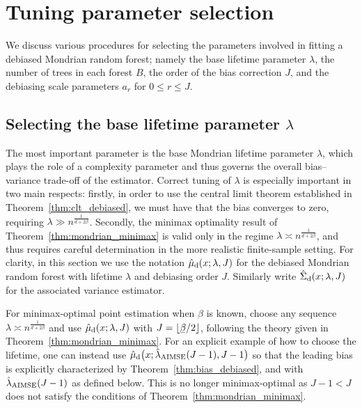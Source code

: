 \section{Tuning parameter selection}%
\label{sec:parameter_selection}

We discuss various procedures for selecting the parameters
involved in fitting a debiased Mondrian random forest;
namely the base lifetime parameter $\lambda$,
the number of trees in each forest $B$,
the order of the bias correction $J$,
and the debiasing scale parameters $a_r$ for $0 \leq r \leq J$.

\subsection{Selecting the base lifetime parameter
\texorpdfstring{$\lambda$}{lambda}}%

The most important parameter is the base Mondrian lifetime parameter $\lambda$,
which plays the role of a complexity parameter and thus governs the overall
bias--variance trade-off of the estimator.
Correct tuning of $\lambda$ is especially important in two main respects:
%
firstly, in order to use the central limit theorem established in
Theorem~\ref{thm:clt_debiased}, we must have that the bias converges to zero,
requiring $\lambda \gg n^{\frac{1}{d + 2\beta}}$.
%
Secondly, the minimax optimality result of Theorem~\ref{thm:mondrian_minimax}
is valid
only in the regime $\lambda \asymp n^{\frac{1}{d + 2\beta}}$,
and thus requires careful determination
in the more realistic finite-sample setting.
For clarity, in this section we use the notation
$\hat\mu_{\mathrm{d}}(x; \lambda, J)$ for the debiased Mondrian random forest
with lifetime $\lambda$ and debiasing order $J$.
Similarly write $\hat\Sigma_{\mathrm{d}}(x; \lambda, J)$ for the
associated variance estimator.

For minimax-optimal point estimation when $\beta$ is known,
choose any sequence $\lambda \asymp n^{\frac{1}{d + 2\beta}}$
and use $\hat\mu_{\mathrm{d}}(x; \lambda, J)$ with
$J = \lfloor \flbeta / 2 \rfloor$,
following the theory given in Theorem~\ref{thm:mondrian_minimax}.
For an explicit example of how to choose the lifetime,
one can instead use
$\hat\mu_{\mathrm{d}}\big(x; \hat\lambda_{\operatorname{AIMSE}}(J-1), J-1\big)$
so that the leading bias is explicitly characterized by
Theorem~\ref{thm:bias_debiased},
and with $\hat\lambda_{\operatorname{AIMSE}}(J-1)$ as defined below.
This is no longer minimax-optimal as $J-1 < J$
does not satisfy the conditions of Theorem~\ref{thm:mondrian_minimax}.


